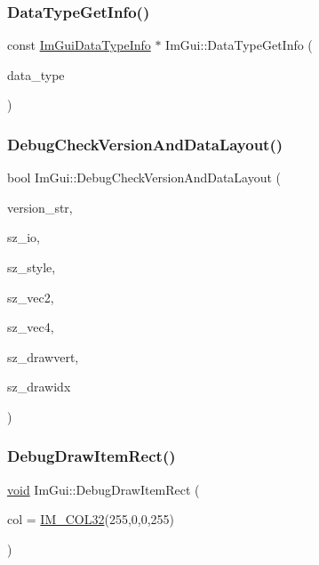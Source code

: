 \subsubsection{\texorpdfstring{Data\+Type\+Get\+Info()}{DataTypeGetInfo()}}
{\footnotesize\ttfamily const \hyperlink{structImGuiDataTypeInfo}{Im\+Gui\+Data\+Type\+Info} $\ast$ Im\+Gui\+::\+Data\+Type\+Get\+Info (\begin{DoxyParamCaption}\item[{Im\+Gui\+Data\+Type}]{data\+\_\+type }\end{DoxyParamCaption})}

\mbox{\label{namespaceImGui_a9fcc162a6de03ea6ad95457718b0683d}} 
\subsubsection{\texorpdfstring{Debug\+Check\+Version\+And\+Data\+Layout()}{DebugCheckVersionAndDataLayout()}}
{\footnotesize\ttfamily bool Im\+Gui\+::\+Debug\+Check\+Version\+And\+Data\+Layout (\begin{DoxyParamCaption}\item[{const char $\ast$}]{version\+\_\+str,  }\item[{size\+\_\+t}]{sz\+\_\+io,  }\item[{size\+\_\+t}]{sz\+\_\+style,  }\item[{size\+\_\+t}]{sz\+\_\+vec2,  }\item[{size\+\_\+t}]{sz\+\_\+vec4,  }\item[{size\+\_\+t}]{sz\+\_\+drawvert,  }\item[{size\+\_\+t}]{sz\+\_\+drawidx }\end{DoxyParamCaption})}

\mbox{\label{namespaceImGui_acdcfb1608a3e75c4700427f81c0a52ac}} 
\subsubsection{\texorpdfstring{Debug\+Draw\+Item\+Rect()}{DebugDrawItemRect()}}
{\footnotesize\ttfamily \hyperlink{imgui__impl__opengl3__loader_8h_ac668e7cffd9e2e9cfee428b9b2f34fa7}{void} Im\+Gui\+::\+Debug\+Draw\+Item\+Rect (\begin{DoxyParamCaption}\item[{Im\+U32}]{col = {\ttfamily \hyperlink{imgui_8h_a123bd4e23eb51ac9dced93eab78c4456}{I\+M\+\_\+\+C\+O\+L32}(255,0,0,255)} }\end{DoxyParamCaption})\hspace{0.3cm}{\ttfamily [inline]}}

